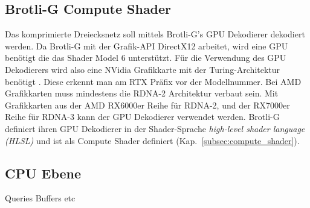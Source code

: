 \subsection{Brotli-G Compute Shader}
\label{subsec:brotlig_compute}
Das komprimierte Dreiecksnetz soll mittels Brotli-G's GPU Dekodierer dekodiert werden.
Da Brotli-G mit der Grafik-API DirectX12 arbeitet, wird eine GPU benötigt die das Shader Model 6 unterstützt.
Für die Verwendung des GPU Dekodierers wird also eine NVidia Grafikkarte mit der Turing-Architektur benötigt \cite{Burgess2020}.
Diese erkennt man am RTX Präfix vor der Modellnummer.
Bei AMD Grafikkarten muss mindestens die RDNA-2 Architektur verbaut sein.
Mit Grafikkarten aus der AMD RX6000er Reihe für RDNA-2, und der RX7000er Reihe für RDNA-3 kann der GPU Dekodierer verwendet werden.
Brotli-G definiert ihren GPU Dekodierer in der Shader-Sprache \textit{high-level shader language (HLSL)} und ist als Compute Shader definiert (Kap.~\ref{subsec:compute_shader}).


\subsection{CPU Ebene}
\label{subsec:brotlig_cpu}
Queries Buffers etc
